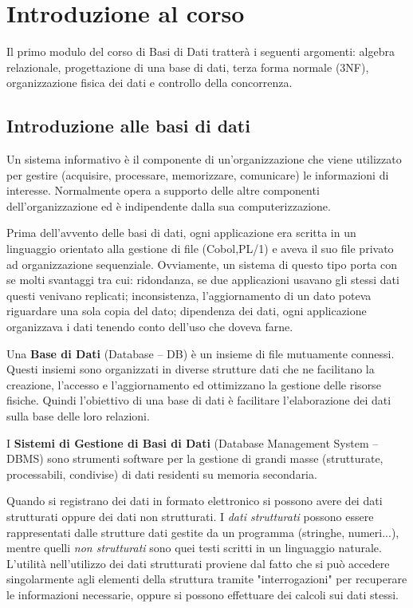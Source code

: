 \chapter{Introduzione al corso}

Il primo modulo del corso di Basi di Dati tratterà i seguenti argomenti: algebra relazionale, progettazione di una base di dati, terza forma normale (3NF), organizzazione fisica dei dati e controllo della concorrenza.

\section{Introduzione alle basi di dati}
Un sistema informativo è il componente di un'organizzazione che viene utilizzato per gestire (acquisire, processare, memorizzare, comunicare) le informazioni di interesse. Normalmente opera a supporto delle altre componenti dell'organizzazione ed è indipendente dalla sua computerizzazione.
 
Prima dell'avvento delle basi di dati, ogni applicazione era scritta in un linguaggio orientato alla gestione di file (Cobol,PL/1) e aveva il suo file privato ad organizzazione sequenziale. Ovviamente, un sistema di questo tipo porta con se molti svantaggi tra cui: ridondanza, se due applicazioni usavano gli stessi dati questi venivano replicati; inconsistenza, l'aggiornamento di un dato poteva riguardare una sola copia del dato; dipendenza dei dati, ogni applicazione organizzava i dati tenendo conto dell'uso che doveva farne.

\begin{redbar}
    Una \textbf{Base di Dati} (Database – DB) è un insieme di file mutuamente connessi. Questi insiemi sono organizzati in diverse strutture dati che ne facilitano la creazione, l'accesso e l'aggiornamento ed ottimizzano la gestione delle risorse fisiche. Quindi l'obiettivo di una base di dati è facilitare l'elaborazione dei dati sulla base delle loro relazioni.
\end{redbar}

\begin{redbar}
    I \textbf{Sistemi di Gestione di Basi di Dati} (Database Management System – DBMS) sono strumenti software per la gestione di grandi masse (strutturate, processabili, condivise) di dati residenti su memoria secondaria.
\end{redbar}

Quando si registrano dei dati in formato elettronico si possono avere dei dati strutturati oppure dei dati non strutturati. I \textit{dati strutturati} possono essere rappresentati dalle strutture dati gestite da un programma (stringhe, numeri...), mentre quelli \textit{non strutturati} sono quei testi scritti in un linguaggio naturale. L'utilità nell'utilizzo dei dati strutturati proviene dal fatto che si può accedere singolarmente agli elementi della struttura tramite "interrogazioni" per recuperare le informazioni necessarie, oppure si possono effettuare dei calcoli sui dati stessi.

